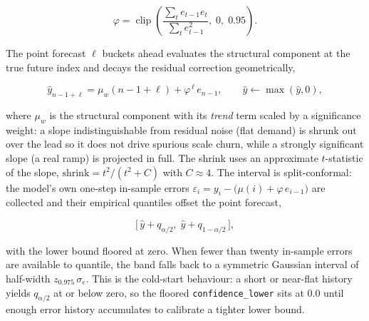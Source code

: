 \begin{equation}\label{bm:eq:phi}
  \varphi = \operatorname{clip}\!\left(
  \frac{\sum_{t} e_{t-1} e_t}{\sum_{t} e_{t-1}^2},\; 0,\; 0.95 \right).
\end{equation}

The point forecast $\ell$ buckets ahead evaluates the structural component at the
true future index and decays the residual correction geometrically,

\begin{equation}\label{bm:eq:point}
  \hat{y}_{n-1+\ell} = \mu_w(n-1+\ell) + \varphi^{\,\ell}\, e_{n-1},
  \qquad \hat{y} \leftarrow \max(\hat{y}, 0),
\end{equation}

where $\mu_w$ is the structural component with its \emph{trend} term scaled by a
significance weight: a slope indistinguishable from residual noise (flat demand)
is shrunk out over the lead so it does not drive spurious scale churn, while a
strongly significant slope (a real ramp) is projected in full. The shrink uses an
approximate $t$-statistic of the slope, $\text{shrink}=t^2/(t^2+C)$ with $C\approx4$.
The interval is split-conformal: the model's own one-step in-sample errors
$\varepsilon_i = y_i - \big(\mu(i) + \varphi\,e_{i-1}\big)$ are collected and their
empirical quantiles offset the point forecast,

\begin{equation}\label{bm:eq:band}
  \big[\,\hat{y} + q_{\alpha/2},\; \hat{y} + q_{1-\alpha/2}\,\big],
\end{equation}

with the lower bound floored at zero. When fewer than twenty in-sample errors are
available to quantile, the band falls back to a symmetric Gaussian interval of
half-width $z_{0.975}\,\sigma_e$. This is the cold-start behaviour: a short or
near-flat history yields $q_{\alpha/2}$ at or below zero, so the floored
\texttt{confidence\_lower} sits at $0.0$ until enough error history accumulates to
calibrate a tighter lower bound.


